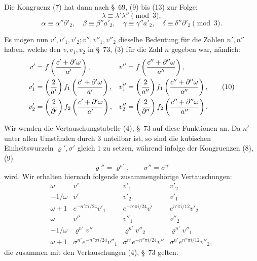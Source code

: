 \documentclass[11pt]{article}
\begin{document}
Die Kongruenz (7) hat dann nach \S~69, (9) bis (13) zur Folge:
\begin{equation}
 \lambda\equiv \lambda'\lambda''\pmod 3,
\tag{8}
\end{equation}
\begin{equation}
 \alpha\equiv \alpha''\partial'_2,
 \quad \beta\equiv \beta''a'_2,
 \quad \gamma\equiv \gamma''a'_2,
 \quad \delta\equiv \delta''\partial'_2\pmod 3.
\tag{9}
\end{equation}

Es mögen nun $v',v'_1,v'_2; v'',v''_1,v''_2$ dieselbe Bedeutung für die Zahlen $n',n''$ haben, welche den $v,v_1,v_2$ in \S~73, (3) für die Zahl $n$ gegeben war, nämlich:
\begin{equation}
\begin{aligned}
v'&=f\left({c'+\partial'\omega\over a'}\right),
&v''&=f\left({c''+\partial''\omega\over a''}\right),\\
v'_1&=\left({2\over a'}\right)f_1\left({c'+\partial'\omega\over a'}\right),
&v''_1&=\left({2\over a''}\right)f_1\left({c''+\partial''\omega\over a''}\right),\\
v'_2&=\left({2\over\partial'}\right)f_2\left({c'+\partial'\omega\over a'}\right),
&v''_2&=\left({2\over\partial''}\right)f_2\left({c''+\partial''\omega\over a''}\right).
\end{aligned}
\tag{10}
\end{equation}

Wir wenden die Vertauschungstabelle (4), \S~73 auf diese Funktionen an. Da $n'$ unter allen Umständen durch $3$ unteilbar ist, so sind die kubischen Einheitswurzeln $\varrho',\sigma'$ gleich $1$ zu setzen, während infolge der Kongruenzen (8), (9)
\begin{equation}
 \varrho''=\varrho^{n'},\qquad \sigma''=\sigma^{n'}
\tag{11}
\end{equation}
wird. Wir erhalten hiernach folgende zusammengehörige Vertauschungen:
\begin{equation}
\begin{array}{c|ccc}
\omega&v'&v'_1&v'_2\\[0.2em]
-1/\omega&v'&v'_2&v'_1\\[0.2em]
\omega+1&e^{-n'\pi i/24}v'_1&e^{-n'\pi i/24}v'&e^{n'\pi i/12}v'_2\\[0.3em]\hline
\omega&v''&v''_1&v''_2\\[0.2em]
-1/\omega&\varrho^{n'}v''&\varrho^{n'}v''_2&\varrho^{n'}v''_1\\[0.2em]
\omega+1&\sigma^{n'}e^{-n''\pi i/24}v''_1&\sigma^{n'}e^{-n''\pi i/24}v''&\sigma^{n'}e^{n''\pi i/12}v''_2,
\end{array}
\tag{12}
\end{equation}
die zusammen mit den Vertauschungen (4), \S~73 gelten.
\end{document}
